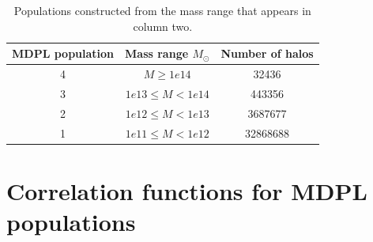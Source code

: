 \begin{table}
\begin{center}
  \begin{tabular}{ | c | c | c | }
    \hline \hline
    MDPL population & Mass range $M_{\odot}$& Number of halos \\ \hline \hline
    4 & $ M \geqslant 1e14$ & 32436 \\ \hline
    3 & $ 1e13 \leq M < 1e14 $ & 443356\\ \hline
    2 & $ 1e12 \leq M < 1e13$ & 3687677\\ \hline
    1 & $ 1e11 \leq M < 1e12$ & 32868688 \\ \hline
  \end{tabular}  
   \caption{ Populations constructed from the mass range that appears in column two. }
\label{pophalos}
\end{center}
\end{table}


\section{ Correlation functions for MDPL populations}



